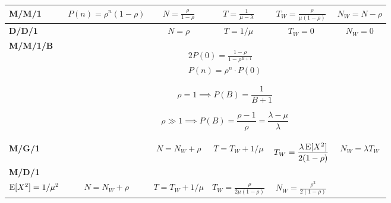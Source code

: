 \documentclass{form}
\begin{document}
\begin{minipage}{0.707\textwidth}
    \begin{tabular}{@{}l || c | c | c | c | c @{}}
        \textbf{M/M/1}   & $\displaystyle P(n) = \rho^n(1-\rho)$   & $\displaystyle N=\frac{\rho}{1-\rho}$ & $\displaystyle T= \frac{1}{\mu-\lambda}$ & $\displaystyle T_W = \frac{\rho}{\mu(1-\rho)}$ & $\displaystyle N_W = N-\rho$ \\ \hline
        \textbf{D/D/1}   &                                         & $\displaystyle N=\rho$                & $\displaystyle T=1/\mu$                  & $\displaystyle T_W = 0$                        & $\displaystyle N_W = 0$      \\ \hline
        \textbf{M/M/1/B} & \multicolumn{5}{c}{
            \begin{minipage}{8em}
                \vspace{-0.8em}
                \begin{alignat*}{2}
                    P(0) = \frac{1-\rho}{1-\rho^{B+1}} \\
                    P(n) = \rho^n\cdot P(0)
                \end{alignat*}
            \end{minipage}
            \begin{minipage}{12em}
                \vspace{-0.8em}
                \begin{equation*}
                    \rho = 1 \implies P(B) = \frac{1}{B+1}
                \end{equation*}
            \end{minipage}
            \begin{minipage}{16em}
                \vspace{-0.8em}
                \begin{equation*}
                    \rho \gg 1 \implies P(B) = \frac{\rho-1}{\rho} = \frac{\lambda-\mu}{\lambda}
                \end{equation*}
            \end{minipage}
        } \\ \hline
        \textbf{M/G/1}   &                                         & $\displaystyle N=N_W + \rho$                & $\displaystyle T=T_W+1/\mu$                             & $\displaystyle T_W = \frac{\lambda \operatorname{E}[X^2]}{2(1-\rho)}$                    & $\displaystyle N_W = \lambda T_W$                 \\ \hline
        \textbf{M/D/1}   & \begin{minipage}{6.1em}$\expected[X]=1/\mu$\\$\operatorname{E}[X^2]=1/\mu^2$\end{minipage} & $\displaystyle N=N_W + \rho$                & $\displaystyle T=T_W+1/\mu$                             & $\displaystyle T_W = \frac{\rho}{2 \mu (1-\rho)}$                    & $\displaystyle N_W = \frac{\rho^2}{2 (1-\rho)}$                 \\

\end{tabular}
\end{minipage}
\end{document}
